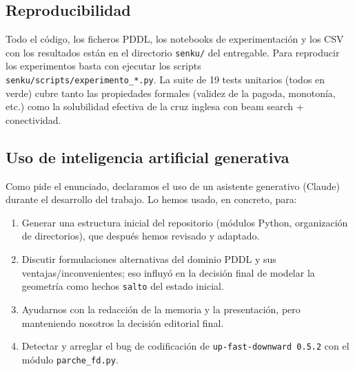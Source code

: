 \documentclass[conference,a4paper]{IEEEtran}
\begin{document}
\subsection{Reproducibilidad}

Todo el código, los ficheros PDDL, los notebooks de experimentación y
los CSV con los resultados están en el directorio \texttt{senku/} del
entregable. Para reproducir los experimentos basta con ejecutar los
scripts \texttt{senku/scripts/experimento\_*.py}. La suite de 19 tests
unitarios (todos en verde) cubre tanto las propiedades formales
(validez de la pagoda, monotonía, etc.) como la solubilidad efectiva de
la cruz inglesa con beam search + conectividad.


\subsection{Uso de inteligencia artificial generativa}

Como pide el enunciado, declaramos el uso de un asistente generativo
(Claude) durante el desarrollo del trabajo. Lo hemos
usado, en concreto, para:

\begin{enumerate}
\item Generar una estructura inicial del repositorio (módulos Python,
  organización de directorios), que después hemos revisado y adaptado.
\item Discutir formulaciones alternativas del dominio PDDL y sus
  ventajas/inconvenientes; eso influyó en la decisión final de
  modelar la geometría como hechos \texttt{salto} del estado inicial.
\item Ayudarnos con la redacción de la memoria y la presentación, pero
  manteniendo nosotros la decisión editorial final.
\item Detectar y arreglar el bug de codificación de
  \texttt{up-fast-downward 0.5.2} con el módulo \texttt{parche\_fd.py}.
\end{enumerate}
\end{document}
